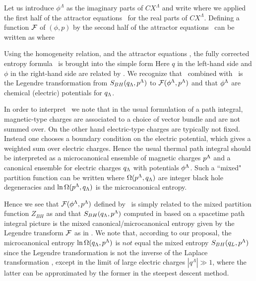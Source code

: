 Let us introduce $\phi^\Lambda$ as the imaginary parts of
$CX^\Lambda$ and write
%
\eqn{}
%
where we applied the first half of the attractor equations \psrf\
for the real parts of $CX^\Lambda$. Defining a
function ${\cal F}$ of $(\phi, p)$ by
%
\eqn\calf{
\eqalign{ {\cal F}(\phi , p ) &
= -\pi\ {\rm Im}\left[ C^2 F\left(X^\Lambda, {256 \over C^2}\right)
\right] \cr
& =- \pi {\rm Im} \left[ F\left( CX^\Lambda, 256\right)\right]\cr
& = - \pi {\rm Im} \left[
F\left( p^\Lambda + {i \over \pi} \phi^\Lambda, 256\right) \right]
,}}
%
the second half of the attractor equations \qrsf\
can be written as
%
\eqn\jji{q_\L=\half(CF_\L+ \bar C\bar
F_\L) = -{\partial \over \partial \phi^\L}
{\cal F}(\phi , p),}
%
where \eqn{}

Using the homogeneity relation,
%
\eqn{}
%
and the attractor equations \jji, the fully corrected entropy
formula \fdc\ is brought into the simple form
%
\eqn{}
%
Here $q$ in the left-hand side and $\phi$ in the right-hand
side are related by \jji .
We recognize that \fji\ combined with \jji\ is the Legendre
transformation from $S_{BH}(q_{\Lambda}, p^{\Lambda})$
to ${\cal F}(\phi^{\Lambda}, p^{\Lambda})$ and that $\phi^{\Lambda}$ are
chemical (electric) potentials for $q_{\Lambda}$.

In order to interpret \fji\ we note that in the usual formulation
of a path integral, magnetic-type charges are associated to a
choice of vector bundle and are not summed over. On the other hand
electric-type charges are typically not fixed. Instead one chooses
a boundary condition on the electric potential, which gives a
weighted sum over electric charges. Hence the usual thermal path
integral should be interpreted as a microcanonical ensemble of
magnetic charges $p^{\Lambda}$ and a canonical ensemble for electric
charges $q_{\Lambda}$ with potentials $\phi^{\Lambda}$. Such a ``mixed"
partition function can be written
%
\eqn{}
%
where $\Omega(p^{\Lambda},q_{\Lambda})$ are integer black hole
degeneracies and $\ln \Omega(p^{\Lambda},q_{\Lambda})$
is the microcanonical entropy.

Hence we see that ${\cal F}(\phi^{\Lambda}, p^{\Lambda})$ defined by \calf\
 is simply related to the mixed partition
function $Z_{BH}$ as
%
\eqn\dxzv{Z_{BH}(\phi^\L,p^\L)= \exp\left[{\cal F}(\phi^\L,
p^\L)\right],}
%
and that $S_{BH}(q_{\Lambda}, p^{\Lambda})$ computed in \refs{\dwz, \dwa, \dwb,
\dwd} based on a
spacetime path integral picture is the mixed
canonical/microcanonical entropy given by the Legendre transform
${\cal F}$ as in \fji .
We note that, according to our proposal, the microcanonical entropy
$\ln \Omega(q_{\Lambda}, p^{\Lambda})$ is $not$ equal the mixed entropy
$S_{BH}(q_L,p^{\Lambda})$ since the Legendre transformation is not
the inverse of the Laplace transformation \sxfl , except in
the limit of large electric charges $|q^\Lambda| \gg 1$,
where the latter can be approximated by the former in the
steepest descent method.


